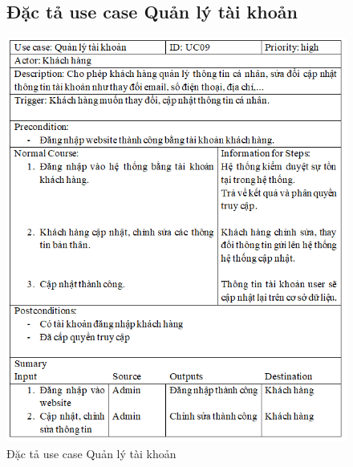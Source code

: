 \documentclass{report}
\begin{document}
\begin{center}
    \begin{figure}[htp]
        \subsection{Đặc tả use case Quản lý tài khoản}
        \begin{center}
            \includegraphics[scale = 1]{image/UC09.PNG}
        \end{center}
        \caption{Đặc tả use case Quản lý tài khoản}
        \label{refhinh1}
    \end{figure}
\end{center}
\end{document}
